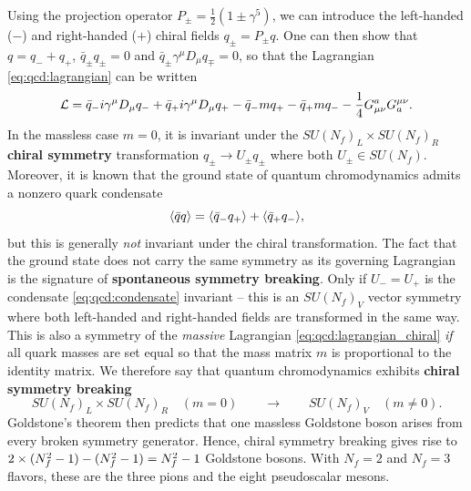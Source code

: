 Using the projection operator $P_\pm = \frac12 (1 \pm \gamma^5)$, we can introduce the left-handed ($-$) and right-handed ($+$) chiral fields $q_\pm = P_\pm q$.
One can then show that $q = q_- + q_+$, $\bar{q}_\pm q_\pm = 0$ and $\bar{q}_\pm \gamma^\mu D_\mu q_\mp = 0$, so that the Lagrangian \eqref{eq:qcd:lagrangian} can be written
\begin{equation}
	\mathcal{L} = \bar{q}_- i \gamma^\mu D_\mu q_- + \bar{q}_+ i \gamma^\mu D_\mu q_+ - \bar{q}_- m q_+ - \bar{q}_+ m q_- - \frac14 G_{\mu\nu}^a G^{\mu\nu}_a.
\label{eq:qcd:lagrangian_chiral}
\end{equation}
In the massless case $m=0$,
it is invariant under the $SU(N_f)_L \times SU(N_f)_R$ \textbf{chiral symmetry} transformation $q_\pm \rightarrow U_\pm q_\pm$ where both $U_\pm \in SU(N_f)$.
Moreover, it is known that the ground state of quantum chromodynamics admits a nonzero quark condensate \cite[chapter 28]{ref:schwartz}
\begin{equation}
	\avg{\bar{q} q} %
	                                                            = \avg{\bar{q}_- q_+} + \avg{\bar{q}_+ q_-},
\label{eq:qcd:condensate}
\end{equation}
but this is generally \emph{not} invariant under the chiral transformation.
The fact that the ground state does not carry the same symmetry as its governing Lagrangian is the signature of \textbf{spontaneous symmetry breaking}.
Only if $U_- = U_+$ is the condensate \eqref{eq:qcd:condensate} invariant -- this is an $SU(N_f)_V$ vector symmetry where both left-handed and right-handed fields are transformed in the same way.
This is also a symmetry of the \emph{massive} Lagrangian \eqref{eq:qcd:lagrangian_chiral} \emph{if} all quark masses are set equal so that the mass matrix $m$ is proportional to the identity matrix.
We therefore say that quantum chromodynamics exhibits \textbf{chiral symmetry breaking}
\begin{equation}
	SU(N_f)_L \times SU(N_f)_R \quad (m = 0) \qquad \longrightarrow \qquad SU(N_f)_V \quad (m \neq 0).
\label{eq:qcd:symmetry_breaking_pattern}
\end{equation}
Goldstone's theorem then predicts that one massless Goldstone boson arises from every broken symmetry generator.
Hence, chiral symmetry breaking gives rise to $2 \times (\smash{N_f^2} - 1) - (\smash{N_f^2} - 1) = \smash{N_f^2} - 1$ Goldstone bosons.
With $N_f = 2$ and $N_f = 3$ flavors, these are the three pions and the eight pseudoscalar mesons.

